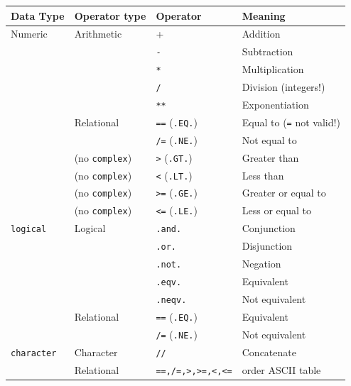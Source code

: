 \begin{table}[!h]
    \centering
    \begin{tabular}{|l|l|l|l|}
        \hline
        Data Type  & Operator type & Operator & Meaning \\ \hline
        Numeric & Arithmetic & + & Addition \\ 
        ~ & ~ & \texttt{-} & Subtraction \\ 
        ~ & ~ & \texttt{*} & Multiplication \\ 
        ~ & ~ & \texttt{/} & Division (integers!) \\ 
        ~ & ~ & \texttt{**} & Exponentiation \\ 
        ~ & Relational & \texttt{==}  (\texttt{.EQ.}) & Equal to (\texttt{=} not valid!) \\ 
        ~ & ~ & \texttt{/=}  (\texttt{.NE.}) & Not equal to \\ 
        ~ & {\footnotesize (no \texttt{complex})} & \texttt{>}  (\texttt{.GT.}) & Greater than  \\ 
        ~ & {\footnotesize (no \texttt{complex})} & \texttt{<} (\texttt{.LT.}) & Less than \\ 
        ~ & {\footnotesize (no \texttt{complex})} & \texttt{>=} (\texttt{.GE.}) & Greater or equal to \\ 
        ~ & {\footnotesize (no \texttt{complex})} & \texttt{<=}  (\texttt{.LE.}) & Less or equal to  \\ \hline
        \texttt{logical} & Logical & \texttt{.and.} & Conjunction \\ 
        ~ & ~ & \texttt{.or.} & Disjunction \\ 
        ~ & ~ & \texttt{.not.} & Negation \\ 
        ~ & ~ & \texttt{.eqv.} & Equivalent \\ 
        ~ & ~ & \texttt{.neqv.} & Not equivalent \\ 
        ~ & Relational &\texttt{==}  (\texttt{.EQ.}) & Equivalent \\ 
        ~ & ~ & \texttt{/=}  (\texttt{.NE.}) & Not equivalent \\ \hline
        \texttt{character} & Character & \texttt{//} & Concatenate \\ 
        ~ & Relational & \texttt{==,/=,>,>=,<,<=} & order ASCII table \\ \hline
    \end{tabular}
\end{table}

 



